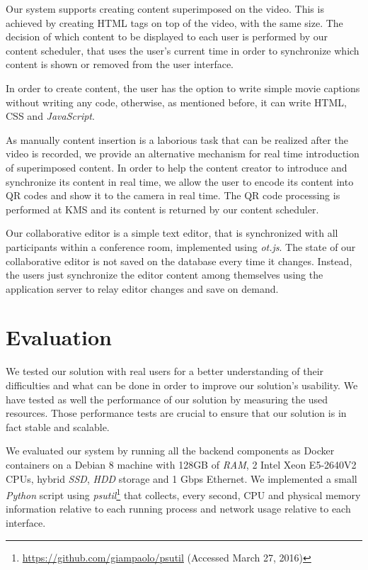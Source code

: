 \documentclass[10pt,conference]{IEEEtran}
\begin{document}
Our system supports creating content superimposed on the video.
This is achieved by creating \gls{HTML} tags on top of the video, with the same size.
The decision of which content to be displayed to each user is performed by our content scheduler, that uses the user's current time in order to synchronize which content is shown or removed from the user interface.

In order to create content, the user has the option to write simple movie captions without writing any code, otherwise, as mentioned before, it can write \gls{HTML}, \gls{CSS} and \emph{JavaScript}.

As manually content insertion is a laborious task that can be realized after the video is recorded, we provide an alternative mechanism for real time introduction of superimposed content.
In order to help the content creator to introduce and synchronize its content in real time, we allow the user to encode its content into \gls{QR} codes and show it to the camera in real time.
The \gls{QR} code processing is performed at \gls{KMS} and its content is returned by our content scheduler.


Our collaborative editor is a simple text editor, that is synchronized with all participants within a conference room, implemented using \emph{ot.js}.
The state of our collaborative editor is not saved on the database every time it changes.
Instead, the users just synchronize the editor content among themselves using the application server to relay editor changes and save on demand.



\section{Evaluation}
\label{chapter:evaluation}


We tested our solution with real users for a better understanding of their difficulties and what can be done in order to improve our solution's usability.
We have tested as well the performance of our solution by measuring the used resources.
Those performance tests are crucial to ensure that our solution is in fact stable and scalable.

We evaluated our system by running all the backend components as Docker containers on a Debian 8 machine with 128GB of \emph{RAM}, 2 Intel Xeon E5-2640V2 CPUs, hybrid \emph{SSD}, \emph{HDD} storage and 1 Gbps Ethernet. 
We implemented a small \emph{Python} script using \emph{psutil}\footnote{\url{https://github.com/giampaolo/psutil} (Accessed March 27, 2016)} that collects, every second, CPU and physical memory information relative to each running process and network usage relative to each interface. 
\end{document}
